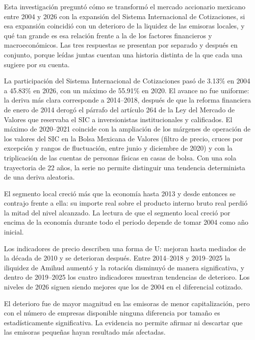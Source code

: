 
Esta investigación preguntó cómo se transformó el mercado accionario mexicano entre 2004 y 2026 con la expansión del Sistema Internacional de Cotizaciones, si esa expansión coincidió con un deterioro de la liquidez de las emisoras locales, y qué tan grande es esa relación frente a la de los factores financieros y macroeconómicos. Las tres respuestas se presentan por separado y después en conjunto, porque leídas juntas cuentan una historia distinta de la que cada una sugiere por su cuenta.


La participación del Sistema Internacional de Cotizaciones pasó de 3.13\% en 2004 a 45.83\% en 2026, con un máximo de 55.91\% en 2020. El avance no fue uniforme: la deriva más clara corresponde a 2014--2018, después de que la reforma financiera de enero de 2014 derogó el párrafo del artículo 264 de la Ley del Mercado de Valores que reservaba el SIC a inversionistas institucionales y calificados. El máximo de 2020--2021 coincide con la ampliación de los márgenes de operación de los valores del SIC en la Bolsa Mexicana de Valores (filtro de precio, cruces por excepción y rangos de fluctuación, entre junio y diciembre de 2020) y con la triplicación de las cuentas de personas físicas en casas de bolsa. Con una sola trayectoria de 22 años, la serie no permite distinguir una tendencia determinista de una deriva aleatoria.

El segmento local creció más que la economía hasta 2013 y desde entonces se contrajo frente a ella: su importe real sobre el producto interno bruto real perdió la mitad del nivel alcanzado. La lectura de que el segmento local creció por encima de la economía durante todo el periodo depende de tomar 2004 como año inicial.


Los indicadores de precio describen una forma de U: mejoran hasta mediados de la década de 2010 y se deterioran después. Entre 2014--2018 y 2019--2025 la iliquidez de Amihud aumentó y la rotación disminuyó de manera significativa, y dentro de 2019--2025 los cuatro indicadores muestran tendencias de deterioro. Los niveles de 2026 siguen siendo mejores que los de 2004 en el diferencial cotizado.

El deterioro fue de mayor magnitud en las emisoras de menor capitalización, pero con el número de empresas disponible ninguna diferencia por tamaño es estadísticamente significativa. La evidencia no permite afirmar ni descartar que las emisoras pequeñas hayan resultado más afectadas.

